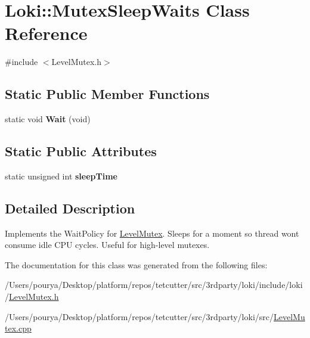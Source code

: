 \hypertarget{classLoki_1_1MutexSleepWaits}{}\section{Loki\+:\+:Mutex\+Sleep\+Waits Class Reference}
\label{classLoki_1_1MutexSleepWaits}


{\ttfamily \#include $<$Level\+Mutex.\+h$>$}

\subsection*{Static Public Member Functions}
\begin{DoxyCompactItemize}
\item 
\hypertarget{classLoki_1_1MutexSleepWaits_a5d418ab7c02a407c76d76107efd225ef}{}static void {\bfseries Wait} (void)\label{classLoki_1_1MutexSleepWaits_a5d418ab7c02a407c76d76107efd225ef}

\end{DoxyCompactItemize}
\subsection*{Static Public Attributes}
\begin{DoxyCompactItemize}
\item 
\hypertarget{classLoki_1_1MutexSleepWaits_a12ac91b8b83bee2434273f0c0c481a22}{}static unsigned int {\bfseries sleep\+Time}\label{classLoki_1_1MutexSleepWaits_a12ac91b8b83bee2434273f0c0c481a22}

\end{DoxyCompactItemize}


\subsection{Detailed Description}
Implements the Wait\+Policy for \hyperlink{classLoki_1_1LevelMutex}{Level\+Mutex}. Sleeps for a moment so thread won\textquotesingle{}t consume idle C\+P\+U cycles. Useful for high-\/level mutexes. 

The documentation for this class was generated from the following files\+:\begin{DoxyCompactItemize}
\item 
/\+Users/pourya/\+Desktop/platform/repos/tetcutter/src/3rdparty/loki/include/loki/\hyperlink{LevelMutex_8h}{Level\+Mutex.\+h}\item 
/\+Users/pourya/\+Desktop/platform/repos/tetcutter/src/3rdparty/loki/src/\hyperlink{LevelMutex_8cpp}{Level\+Mutex.\+cpp}\end{DoxyCompactItemize}
